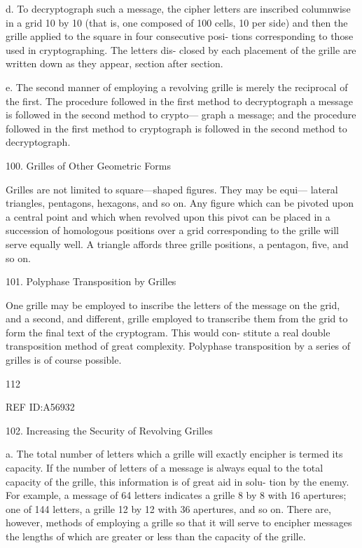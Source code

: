d. To decryptograph such a message, the cipher letters are inscribed
columnwise in a grid 10 by 10 (that is, one composed of 100 cells, 10 per
side) and then the grille applied to the square in four consecutive posi-
tions corresponding to those used in cryptographing. The letters dis-
closed by each placement of the grille are written down as they appear,
section after section.

e. The second manner of employing a revolving grille is merely the
reciprocal of the ﬁrst. The procedure followed in the ﬁrst method to
decryptograph a message is followed in the second method to crypto—
graph a message; and the procedure followed in the ﬁrst method to
cryptograph is followed in the second method to decryptograph.

100. Grilles of Other Geometric Forms

Grilles are not limited to square—shaped ﬁgures. They may be equi—
lateral triangles, pentagons, hexagons, and so on. Any ﬁgure which can
be pivoted upon a central point and which when revolved upon this
pivot can be placed in a succession of homologous positions over a grid
corresponding to the grille will serve equally well. A triangle affords
three grille positions, a pentagon, ﬁve, and so on.

101. Polyphase Transposition by Grilles

One grille may be employed to inscribe the letters of the message on
the grid, and a second, and different, grille employed to transcribe them
from the grid to form the ﬁnal text of the cryptogram. This would con-
stitute a real double transposition method of great complexity. Polyphase
transposition by a series of grilles is of course possible.

112

 

REF ID:A56932

102. Increasing the Security of Revolving Grilles

a. The total number of letters which a grille will exactly encipher is
termed its capacity. If the number of letters of a message is always equal
to the total capacity of the grille, this information is of great aid in solu-
tion by the enemy. For example, a message of 64 letters indicates a grille
8 by 8 with 16 apertures; one of 144 letters, a grille 12 by 12 with 36
apertures, and so on. There are, however, methods of employing a
grille so that it will serve to encipher messages the lengths of which are
greater or less than the capacity of the grille.

